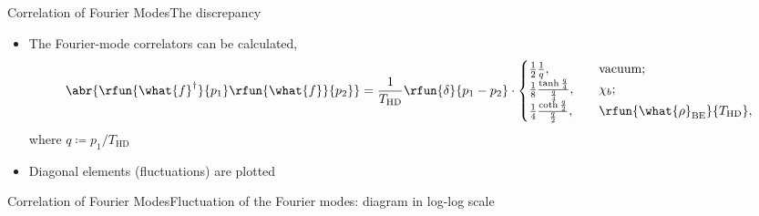 \documentclass{beamer}
\begin{document}

\begin{frame}{Correlation of Fourier Modes}{The discrepancy}

\begin{itemize}
\item The Fourier-mode correlators can be calculated,
\begin{equation}
\abr{\rfun{\what{f}^\dagger}{p_1}\rfun{\what{f}}{p_2}} =
\frac{1}{T_\text{HD}} \rfun{\delta}{p_1 - p_2} \cdot
\begin{cases}
\frac{1}{2} \frac{1}{q},
&\quad \text{vacuum};\\
\frac{1}{8}\frac{\tanh\frac{q}{4}}{\frac{q}{4}},
&\quad \chi_b; \\
\frac{1}{4} \frac{\coth\frac{q}{2}}{\frac{q}{2}},
&\quad \rfun{\what{\rho}_\text{BE}}{T_\text{HD}},
\end{cases}
\end{equation}
where $q \coloneqq p_1/T_\text{HD}$
\item Diagonal elements (fluctuations) are plotted
\end{itemize}

\end{frame}

\begin{frame}{Correlation of Fourier Modes}{Fluctuation of the Fourier 
modes: diagram in log-log scale}

%

\end{frame}
\end{document}
